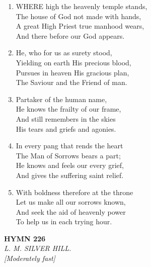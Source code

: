 \begin{enumerate}
    \item WHERE high the heavenly temple stands, \\
        The house of God not made with hands, \\
        A great High Priest true manhood wears, \\
        And there before our God appears.

    \item He, who for us as surety stood, \\
        Yielding on earth His precious blood, \\
        Pursues in heaven His gracious plan, \\
        The Saviour and the Friend of man.

    \item Partaker of the human name, \\
        He knows the frailty of our frame, \\
        And still remembers in the skies \\
        His tears and griefs and agonies.

    \item In every pang that rends the heart \\
        The Man of Sorrows bears a part; \\
        He knows and feels our every grief, \\
        And gives the suffering saint relief.

    \item With boldness therefore at the throne \\
        Let us make all our sorrows known, \\
        And seek the aid of heavenly power \\
        To help us in each trying hour.

\end{enumerate}

\newpage
\begin{center}
    {\Large \textbf{HYMN 226}}
    \\
    \textit{L. M. SILVER HILL.}
    \\
    \textit{\small [Moderately fast]}
\end{center}
\vspace{1em}

